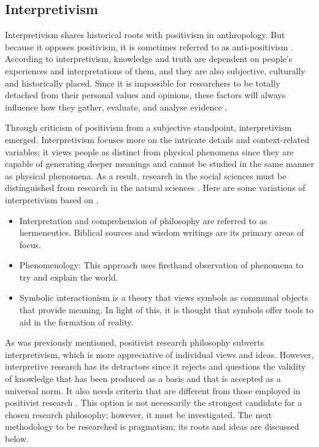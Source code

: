 {\subsection{Interpretivism}
\par{Interpretivism shares historical roots with positivism in anthropology. But because it opposes positivism, it is sometimes referred to as anti-positivism \citep{flick2004qualitative}. According to interpretivism, knowledge and truth are dependent on people's experiences and interpretations of them, and they are also subjective, culturally and historically placed. Since it is impossible for researchers to be totally detached from their personal values and opinions, these factors will always influence how they gather, evaluate, and analyse evidence \citep{ryan2018introduction}.}
\par{Through criticism of positivism from a subjective standpoint, interpretivism emerged.
Interpretivism focuses more on the intricate details and context-related variables; it views people as distinct from physical phenomena since they are capable of generating deeper meanings and cannot be studied in the same manner as physical phenomena. As a result, research in the social sciences must be distinguished from research in the natural sciences \citep{alharahsheh2020review}. Here are some variations of interpretivism based on \cite{littlejohn2009encyclopedia}.
\begin{itemize}
    \item Interpretation and comprehension of philosophy are referred to as hermeneutics. Biblical sources and wisdom writings are its primary areas of focus.
    \item Phenomenology: This approach uses firsthand observation of phenomena to try and explain the world. 
    \item Symbolic interactionism is a theory that views symbols as communal objects that provide meaning. In light of this, it is thought that symbols offer tools to aid in the formation of reality. 
\end{itemize}
\par{As was previously mentioned, positivist research philosophy subverts interpretivism, which is more appreciative of individual views and ideas. However, interpretive research has its detractors since it rejects and questions the validity of knowledge that has been produced as a basis and that is accepted as a universal norm. It also needs criteria that are different from those employed in positivist research \citep{alharahsheh2020review}. This option is not necessarily the strongest candidate for a chosen research philosophy; however, it must be investigated. The next methodology to be researched is pragmatism; its roots and ideas are discussed below.}
}}
